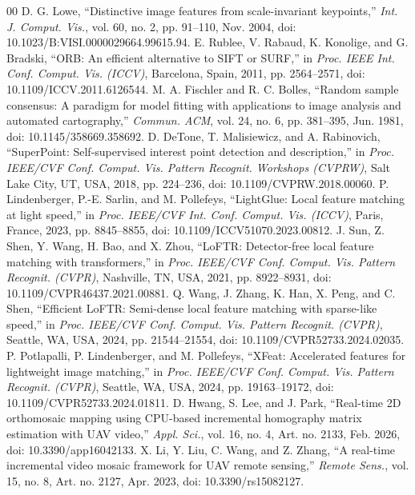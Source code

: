 \documentclass[conference]{IEEEtran}
\begin{document}
\begin{thebibliography}{00}
 D. G. Lowe, ``Distinctive image features from scale-invariant keypoints,'' \emph{Int. J. Comput. Vis.}, vol. 60, no. 2, pp. 91--110, Nov. 2004, doi: 10.1023/B:VISI.0000029664.99615.94.
 E. Rublee, V. Rabaud, K. Konolige, and G. Bradski, ``ORB: An efficient alternative to SIFT or SURF,'' in \emph{Proc. IEEE Int. Conf. Comput. Vis. (ICCV)}, Barcelona, Spain, 2011, pp. 2564--2571, doi: 10.1109/ICCV.2011.6126544.
 M. A. Fischler and R. C. Bolles, ``Random sample consensus: A paradigm for model fitting with applications to image analysis and automated cartography,'' \emph{Commun. ACM}, vol. 24, no. 6, pp. 381--395, Jun. 1981, doi: 10.1145/358669.358692.
 D. DeTone, T. Malisiewicz, and A. Rabinovich, ``SuperPoint: Self-supervised interest point detection and description,'' in \emph{Proc. IEEE/CVF Conf. Comput. Vis. Pattern Recognit. Workshops (CVPRW)}, Salt Lake City, UT, USA, 2018, pp. 224--236, doi: 10.1109/CVPRW.2018.00060.
 P. Lindenberger, P.-E. Sarlin, and M. Pollefeys, ``LightGlue: Local feature matching at light speed,'' in \emph{Proc. IEEE/CVF Int. Conf. Comput. Vis. (ICCV)}, Paris, France, 2023, pp. 8845--8855, doi: 10.1109/ICCV51070.2023.00812.
 J. Sun, Z. Shen, Y. Wang, H. Bao, and X. Zhou, ``LoFTR: Detector-free local feature matching with transformers,'' in \emph{Proc. IEEE/CVF Conf. Comput. Vis. Pattern Recognit. (CVPR)}, Nashville, TN, USA, 2021, pp. 8922--8931, doi: 10.1109/CVPR46437.2021.00881.
 Q. Wang, J. Zhang, K. Han, X. Peng, and C. Shen, ``Efficient LoFTR: Semi-dense local feature matching with sparse-like speed,'' in \emph{Proc. IEEE/CVF Conf. Comput. Vis. Pattern Recognit. (CVPR)}, Seattle, WA, USA, 2024, pp. 21544--21554, doi: 10.1109/CVPR52733.2024.02035.
 P. Potlapalli, P. Lindenberger, and M. Pollefeys, ``XFeat: Accelerated features for lightweight image matching,'' in \emph{Proc. IEEE/CVF Conf. Comput. Vis. Pattern Recognit. (CVPR)}, Seattle, WA, USA, 2024, pp. 19163--19172, doi: 10.1109/CVPR52733.2024.01811.
 D. Hwang, S. Lee, and J. Park, ``Real-time 2D orthomosaic mapping using CPU-based incremental homography matrix estimation with UAV video,'' \emph{Appl. Sci.}, vol. 16, no. 4, Art. no. 2133, Feb. 2026, doi: 10.3390/app16042133.
 X. Li, Y. Liu, C. Wang, and Z. Zhang, ``A real-time incremental video mosaic framework for UAV remote sensing,'' \emph{Remote Sens.}, vol. 15, no. 8, Art. no. 2127, Apr. 2023, doi: 10.3390/rs15082127.

\end{thebibliography}
\end{document}

